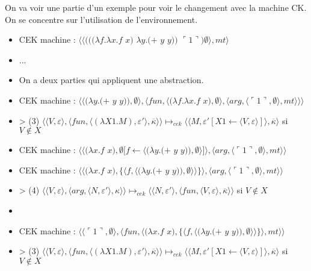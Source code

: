 \documentclass[10pt,a4paper]{article}
\begin{document}
				
				On va voir une partie d'un exemple pour voir le changement avec la machine CK. On se concentre sur l'utilisation de l'environnement.
				\medbreak
				
				\begin{itemize}
					\item[] CEK machine : $\langle\langle(((\lambda f.\lambda x.f$ $x)$ $\lambda y.(+$ $y$ $y))$ $\ulcorner 1\urcorner)\emptyset\rangle,mt\rangle$
					\item[] ...
					\item[] On a deux parties qui appliquent une abstraction.
					\item[] CEK machine : $\langle\langle(\lambda y.(+$ $y$ $y)),\emptyset\rangle,\langle fun,\langle(\lambda f.\lambda x.f$ $x),\emptyset\rangle,\langle arg,\langle\ulcorner 1\urcorner,\emptyset\rangle,mt\rangle\rangle\rangle$
					\item[] > (3) $\langle\langle V,\varepsilon\rangle,\langle fun,\langle (\lambda X1.M),\varepsilon'\rangle,\overline{\kappa} \rangle \rangle \longmapsto_{cek} \langle \langle M,\varepsilon'[X1 \leftarrow \langle V,\varepsilon\rangle]\rangle,\overline{\kappa}\rangle$ si $V \notin X$
					\item[] CEK machine : $\langle\langle(\lambda x.f$ $x),\emptyset[f \leftarrow \langle(\lambda y.(+$ $y$ $y)),\emptyset\rangle]\rangle,\langle arg,\langle\ulcorner 1\urcorner,\emptyset\rangle,mt\rangle\rangle$
					\item[] CEK machine : $\langle\langle(\lambda x.f$ $x),\{\langle f,\langle(\lambda y.(+$ $y$ $y)),\emptyset\rangle\rangle\}\rangle,\langle arg,\langle\ulcorner 1\urcorner,\emptyset\rangle,mt\rangle\rangle$
					\item[] > (4) $\langle \langle V,\varepsilon\rangle,\langle arg,\langle N,\varepsilon'\rangle,\kappa\rangle\rangle \longmapsto_{cek} \langle \langle N,\varepsilon'\rangle,\langle fun,\langle V,\varepsilon\rangle,\overline{\kappa}\rangle\rangle$ si $V \notin X$
					\item[]
					\item[] CEK machine : $\langle\langle\ulcorner 1\urcorner,\emptyset\rangle,\langle fun,\langle(\lambda x.f$ $x),\{\langle f,\langle(\lambda y.(+$ $y$ $y)),\emptyset\rangle\rangle\}\rangle,mt\rangle\rangle$
					\item[] > (3) $\langle\langle V,\varepsilon\rangle,\langle fun,\langle (\lambda X1.M),\varepsilon'\rangle,\overline{\kappa} \rangle \rangle \longmapsto_{cek} \langle \langle M,\varepsilon'[X1 \leftarrow \langle V,\varepsilon\rangle]\rangle,\overline{\kappa}\rangle$ si $V \notin X$

\end{itemize}
\end{document}
